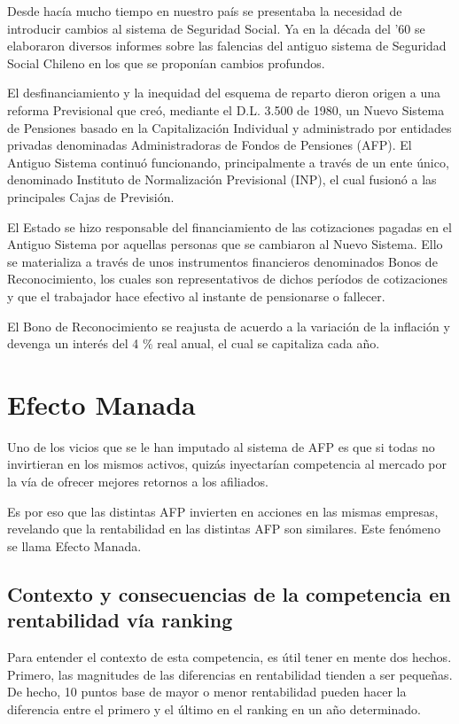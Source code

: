 Desde hac\'ia mucho tiempo en nuestro pa\'is se presentaba la necesidad de introducir cambios al sistema de Seguridad Social. Ya en la d\'ecada del '60 se elaboraron diversos informes sobre las falencias del antiguo sistema de Seguridad Social Chileno en los que se propon\'ian cambios profundos.

El desfinanciamiento y la inequidad del esquema de reparto dieron origen a una reforma Previsional que cre\'o, mediante el D.L. 3.500 de 1980, un Nuevo Sistema de Pensiones basado en la Capitalizaci\'on Individual y administrado por entidades privadas denominadas Administradoras de Fondos de Pensiones (AFP). El Antiguo Sistema continu\'o funcionando, principalmente a trav\'es de un ente \'unico, denominado Instituto de Normalizaci\'on Previsional (INP), el cual fusion\'o a las principales Cajas de Previsi\'on.

El Estado se hizo responsable del financiamiento de las cotizaciones pagadas en el Antiguo Sistema por aquellas personas que se cambiaron al Nuevo Sistema. Ello se materializa a trav\'es de unos instrumentos financieros denominados Bonos de Reconocimiento, los cuales son representativos de dichos per\'iodos de cotizaciones y que el trabajador hace efectivo al instante de pensionarse o fallecer.

El Bono de Reconocimiento se reajusta de acuerdo a la variaci\'on de la inflaci\'on y devenga un inter\'es del 4 $\%$ real anual, el cual se capitaliza cada a\~{n}o.

\section{Efecto Manada}

Uno de los vicios que se le han imputado al sistema de AFP es que si todas no invirtieran en
los mismos activos, quiz\'as inyectar\'ian competencia al mercado por la v\'ia de ofrecer mejores
 retornos a los afiliados.

Es por eso que las distintas AFP invierten en acciones en las mismas empresas, revelando que la rentabilidad en las distintas  AFP son similares.
Este fen\'omeno se llama Efecto Manada.

\subsection{Contexto y consecuencias de la competencia en rentabilidad v\'ia ranking}

Para entender el contexto de esta competencia, es \'util tener en mente dos hechos.
Primero, las magnitudes de las diferencias en rentabilidad tienden a ser peque\~nas. De hecho, 10 puntos base de mayor o menor rentabilidad pueden hacer la diferencia entre el primero y el \'ultimo en el ranking en un a\~no determinado.

